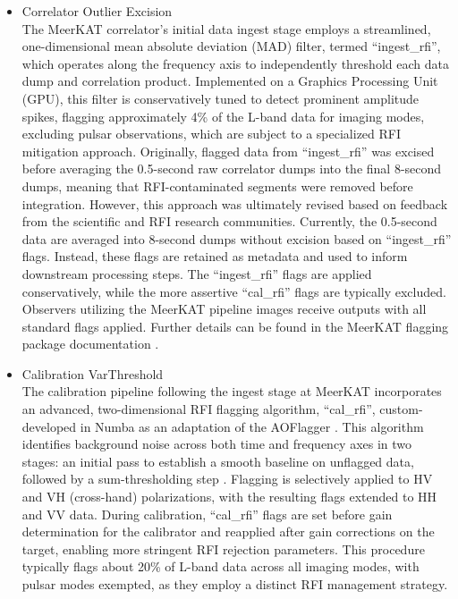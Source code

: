 \begin{itemize}
\item Correlator Outlier Excision\\
The MeerKAT correlator's initial data ingest stage employs a streamlined, one-dimensional mean absolute deviation (MAD) filter, termed ``ingest\_rfi'', which operates along the frequency axis to independently threshold each data dump and correlation product. Implemented on a Graphics Processing Unit (GPU), this filter is conservatively tuned to detect prominent amplitude spikes, flagging approximately 4\% of the L-band data for imaging modes, excluding pulsar observations, which are subject to a specialized RFI mitigation approach. Originally, flagged data from ``ingest\_rfi'' was excised before averaging the 0.5-second raw correlator dumps into the final 8-second dumps, meaning that RFI-contaminated segments were removed before integration. However, this approach was ultimately revised based on feedback from the scientific and RFI research communities.
Currently, the 0.5-second data are averaged into 8-second dumps without excision based on ``ingest\_rfi'' flags. Instead, these flags are retained as metadata and used to inform downstream processing steps.
The ``ingest\_rfi'' flags are applied conservatively, while the more assertive ``cal\_rfi'' flags are typically excluded. Observers utilizing the MeerKAT pipeline images receive outputs with all standard flags applied. Further details can be found in the MeerKAT flagging package documentation \citep{hugo2022tricolouroptimizedsumthresholdflagger}.

\item Calibration VarThreshold\\
The calibration pipeline following the ingest stage at MeerKAT incorporates an advanced, two-dimensional RFI flagging algorithm, ``cal\_rfi'', custom-developed in Numba as an adaptation of the AOFlagger \cite[https://aoflagger.readthedocs.io]{offringa2010lofarrfidetectionpipeline}. This algorithm identifies background noise across both time and frequency axes in two stages: an initial pass to establish a smooth baseline on unflagged data, followed by a sum-thresholding step \cite{sihlangu2019meerkat}. Flagging is selectively applied to HV and VH (cross-hand) polarizations, with the resulting flags extended to HH and VV data. During calibration, ``cal\_rfi'' flags are set before gain determination for the calibrator and reapplied after gain corrections on the target, enabling more stringent RFI rejection parameters. This procedure typically flags about 20\% of L-band data across all imaging modes, with pulsar modes exempted, as they employ a distinct RFI management strategy.


\end{itemize}

